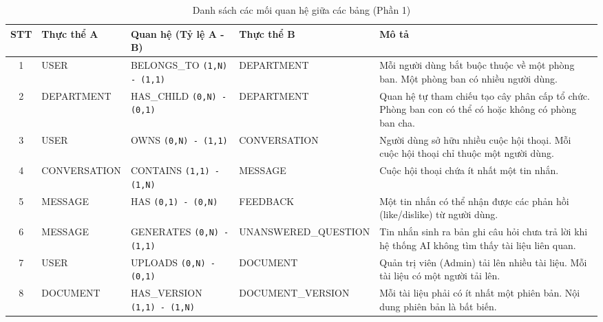 \documentclass[12pt,a4paper]{report}
\begin{document}
\begin{table}[H]
\centering
\small
\caption{Danh sách các mối quan hệ giữa các bảng (Phần 1)}
\label{tab:relations_part1}
\begin{tabularx}{\textwidth}{|c|>{\hsize=0.8\hsize\raggedright\arraybackslash}X|>{\hsize=1.1\hsize\raggedright\arraybackslash}X|>{\hsize=0.8\hsize\raggedright\arraybackslash}X|>{\hsize=1.3\hsize\raggedright\arraybackslash}X|}
\hline
\rowcolor{gray!10}
STT & Thực thể A & Quan hệ (Tỷ lệ A - B) & Thực thể B & Mô tả \\ \hline
1 & USER & BELONGS\_\allowbreak TO \texttt{(1,N) - (1,1)} & DEPARTMENT & Mỗi người dùng bắt buộc thuộc về một phòng ban. Một phòng ban có nhiều người dùng. \\ \hline
2 & DEPARTMENT & HAS\_\allowbreak CHILD \texttt{(0,N) - (0,1)} & DEPARTMENT & Quan hệ tự tham chiếu tạo cây phân cấp tổ chức. Phòng ban con có thể có hoặc không có phòng ban cha. \\ \hline
3 & USER & OWNS \texttt{(0,N) - (1,1)} & CONVERSATION & Người dùng sở hữu nhiều cuộc hội thoại. Mỗi cuộc hội thoại chỉ thuộc một người dùng. \\ \hline
4 & CONVERSATION & CONTAINS \texttt{(1,1) - (1,N)} & MESSAGE & Cuộc hội thoại chứa ít nhất một tin nhắn. \\ \hline
5 & MESSAGE & HAS \texttt{(0,1) - (0,N)} & FEEDBACK & Một tin nhắn có thể nhận được các phản hồi (like/dislike) từ người dùng. \\ \hline
6 & MESSAGE & GENERATES \texttt{(0,N) - (1,1)} & UNANSWERED\_\allowbreak QUESTION & Tin nhắn sinh ra bản ghi câu hỏi chưa trả lời khi hệ thống AI không tìm thấy tài liệu liên quan. \\ \hline
7 & USER & UPLOADS \texttt{(0,N) - (0,1)} & DOCUMENT & Quản trị viên (Admin) tải lên nhiều tài liệu. Mỗi tài liệu có một người tải lên. \\ \hline
8 & DOCUMENT & HAS\_\allowbreak VERSION \texttt{(1,1) - (1,N)} & DOCUMENT\_\allowbreak VERSION & Mỗi tài liệu phải có ít nhất một phiên bản. Nội dung phiên bản là bất biến. \\ \hline
\end{tabularx}
\end{table}
\end{document}
